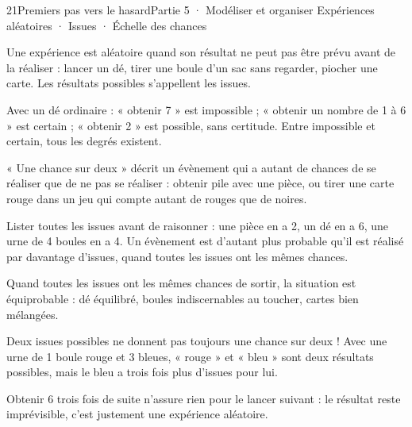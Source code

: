 \begin{ouverture}[probabilites]{21}{Premiers pas vers le hasard}{Partie 5 · Modéliser et organiser}
{Expériences aléatoires · Issues · Échelle des chances}
\end{ouverture}
\pagestyle{otMain}\essentiel\fontsize{11}{15}\selectfont
{}\label{cours-21-1}
\begin{definition}Une expérience est aléatoire quand son résultat ne peut pas être prévu avant de la réaliser : lancer un dé, tirer une boule d’un sac sans regarder, piocher une carte. Les résultats possibles s’appellent les issues.\end{definition}
\begin{exemple}Avec un dé ordinaire : « obtenir 7 » est impossible ; « obtenir un nombre de 1 à 6 » est certain ; « obtenir 2 » est possible, sans certitude. Entre impossible et certain, tous les degrés existent.\end{exemple}
\label{fig-cours-21-1-cours-echelle}

\begin{savoirfaire}« Une chance sur deux » décrit un évènement qui a autant de chances de se réaliser que de ne pas se réaliser : obtenir pile avec une pièce, ou tirer une carte rouge dans un jeu qui compte autant de rouges que de noires.\end{savoirfaire}
\clearpage
{}\label{cours-21-2}
\begin{savoirfaire}Lister toutes les issues avant de raisonner : une pièce en a 2, un dé en a 6, une urne de 4 boules en a 4. Un évènement est d’autant plus probable qu’il est réalisé par davantage d’issues, quand toutes les issues ont les mêmes chances.\end{savoirfaire}
\begin{definition}Quand toutes les issues ont les mêmes chances de sortir, la situation est équiprobable : dé équilibré, boules indiscernables au toucher, cartes bien mélangées.\end{definition}
\begin{attention}Deux issues possibles ne donnent pas toujours une chance sur deux ! Avec une urne de 1 boule rouge et 3 bleues, « rouge » et « bleu » sont deux résultats possibles, mais le bleu a trois fois plus d’issues pour lui.\end{attention}
\begin{exemple}Obtenir 6 trois fois de suite n’assure rien pour le lancer suivant : le résultat reste imprévisible, c’est justement une expérience aléatoire.\end{exemple}


